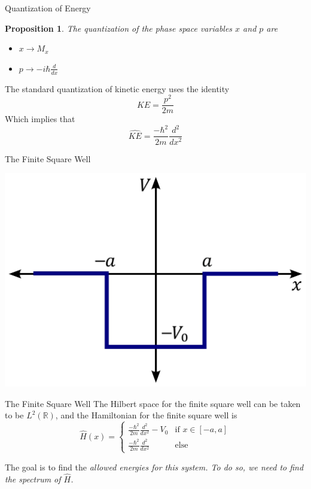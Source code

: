 \documentclass{beamer}
\newtheorem{proposition}{Proposition}
\begin{document}
\begin{frame}{Quantization of Energy}
    \begin{proposition}
        The quantization of the phase space variables $x$ and $p$ are
        \begin{itemize}
            \item $x \to M_x$
            \item $p \to -i\hbar\frac{d}{dx}$
        \end{itemize}
    \end{proposition}
    \begin{example}
        The standard quantization of kinetic energy uses the identity
        \[
            KE = \frac{p^2}{2m}
        \]
        Which implies that
        \[
            \hat{KE} = \frac{-\hbar^2}{2m}\frac{d^2}{dx^2}
        \]
    \end{example}
\end{frame}
\begin{frame}{The Finite Square Well}

    \begin{center}
    \includegraphics[scale=0.09]{FSW.jpg}
    \end{center}

\end{frame}
\begin{frame}{The Finite Square Well}
    The Hilbert space for the finite square well can be taken to be
    $L^2(\mathbb{R})$, and
    the Hamiltonian for the finite square well is 
    \[
        \hat{H}(x) =
        \begin{cases}
            \frac{-\hbar^2}{2m}\frac{d^2}{dx^2} - V_0& \text{if } x\in[-a,a]\\
            \frac{-\hbar^2}{2m}\frac{d^2}{dx^2} &\text{else}
        \end{cases}
    \]

    The goal is to find the \em allowed energies \em for this system. To do so,
    we need to find the spectrum of $\hat{H}$.
\end{frame}
\end{document}
